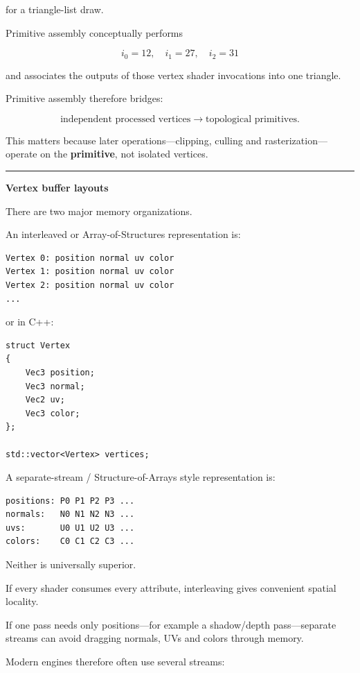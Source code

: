 for a triangle-list draw.

Primitive assembly conceptually performs

\[
i_0=12,\quad i_1=27,\quad i_2=31
\]

and associates the outputs of those vertex shader invocations into one triangle.

Primitive assembly therefore bridges:

\[
\text{independent processed vertices}
\rightarrow
\text{topological primitives}.
\]

This matters because later operations---clipping, culling and rasterization---operate on the \textbf{primitive}, not isolated vertices.

\begin{center}\rule{0.5\linewidth}{0.5pt}\end{center}

\textbf{Vertex buffer layouts}

There are two major memory organizations.

An interleaved or Array-of-Structures representation is:

\begin{verbatim}
Vertex 0: position normal uv color
Vertex 1: position normal uv color
Vertex 2: position normal uv color
...
\end{verbatim}

or in C++:

\begin{verbatim}
struct Vertex
{
    Vec3 position;
    Vec3 normal;
    Vec2 uv;
    Vec3 color;
};

std::vector<Vertex> vertices;
\end{verbatim}

A separate-stream / Structure-of-Arrays style representation is:

\begin{verbatim}
positions: P0 P1 P2 P3 ...
normals:   N0 N1 N2 N3 ...
uvs:       U0 U1 U2 U3 ...
colors:    C0 C1 C2 C3 ...
\end{verbatim}

Neither is universally superior.

If every shader consumes every attribute, interleaving gives convenient spatial locality.

If one pass needs only positions---for example a shadow/depth pass---separate streams can avoid dragging normals, UVs and colors through memory.

Modern engines therefore often use several streams:

